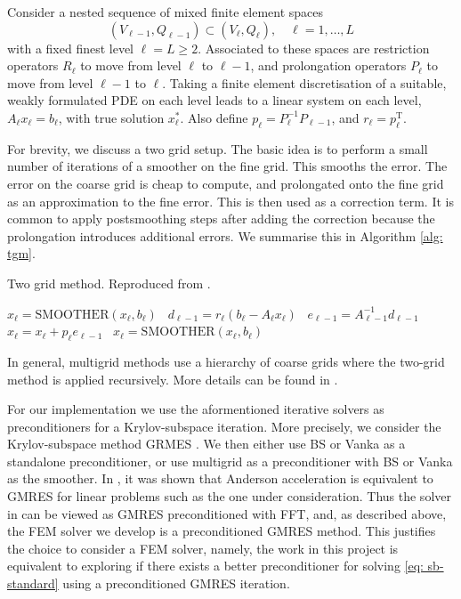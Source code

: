\documentclass[12pt]{article}
\renewcommand\brack[1]{\left (#1\right)}
\theoremstyle{theorem}
\begin{document}
Consider a nested sequence of mixed finite element spaces
$$
(V_{\ell - 1}, Q_{\ell - 1}) \subset (V_\ell, Q_\ell), \quad \ell = 1, \ldots, L
$$
with a fixed finest level $\ell = L \geq 2$. Associated to these spaces are restriction operators $R_\ell$ to move from level $\ell$ to $\ell - 1$, and prolongation operators $P_\ell$ to move from level $\ell - 1$ to $\ell$. Taking a finite element discretisation of a suitable, weakly formulated PDE on each level leads to a linear system on each level, $A_\ell x_\ell = b_\ell$, with true solution $x_\ell^*.$ Also define $p_\ell = P_\ell^{-1}P_{\ell-1}$, and $r_\ell = p_\ell^\mathrm{T}$.

For brevity, we discuss a two grid setup. The basic idea is to perform a small number of iterations of a smoother on the fine grid. This smooths the error. The error on the coarse grid is cheap to compute, and prolongated onto the fine grid as an approximation to the fine error. This is then used as a correction term. It is common to apply postsmoothing steps after adding the correction because the prolongation introduces additional errors. We summarise this in Algorithm \ref{alg: tgm}.


\begin{algorithm}
\caption{Two grid method. Reproduced from \cite{reusken2008introduction}.}\label{alg: tgm}
{
    $x_\ell = \mathrm{SMOOTHER}\brack{x_\ell, b_\ell}$ \ 
    $d_{\ell-1} = r_\ell(b_\ell - A_\ell x_\ell)$ \
    $e_{\ell-1} = A_{\ell-1}^{-1}d_{\ell-1}$ \
    $x_\ell = x_\ell + p_\ell e_{\ell-1}$ \
    $x_\ell = \mathrm{SMOOTHER}\brack{x_\ell, b_\ell}$ 
}
\KwOut{$x_\ell$}
\end{algorithm}

In general, multigrid methods use a hierarchy of coarse grids where the two-grid method is applied recursively. More details can be found in \cite{reusken2008introduction}.

For our implementation we use the aformentioned iterative solvers as preconditioners for a Krylov-subspace iteration. More precisely, we consider the Krylov-subspace method GRMES \cite{saad1986gmres}. We then either use BS or Vanka as a standalone preconditioner, or use multigrid as a preconditioner with BS or Vanka as the smoother. In \cite{walker2011anderson}, it was shown that Anderson acceleration is equivalent to GMRES for linear problems such as the one under consideration. Thus the solver in \cite{chen2023} can be viewed as GMRES preconditioned with FFT, and, as described above, the FEM solver we develop is a preconditioned GMRES method. This justifies the choice to consider a FEM solver, namely, the work in this project is equivalent to exploring if there exists a better preconditioner for solving \eqref{eq: sb-standard} using a preconditioned GMRES iteration.
\end{document}
